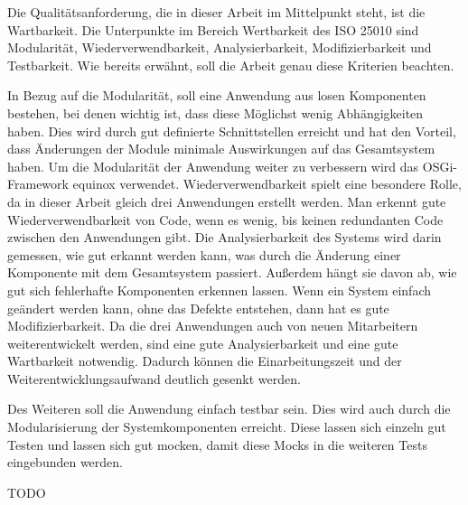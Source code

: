Die Qualitätsanforderung, die in dieser Arbeit im Mittelpunkt steht, ist die Wartbarkeit. Die Unterpunkte im Bereich Wertbarkeit des ISO 25010 sind Modularität, Wiederverwendbarkeit, Analysierbarkeit, Modifizierbarkeit und Testbarkeit. Wie bereits erwähnt, soll die Arbeit genau diese Kriterien beachten. 

In Bezug auf die Modularität, soll eine Anwendung aus losen Komponenten bestehen, bei denen wichtig ist, dass diese Möglichst wenig Abhängigkeiten haben. Dies wird durch gut definierte Schnittstellen erreicht und hat den Vorteil, dass Änderungen der Module minimale Auswirkungen auf das Gesamtsystem haben. Um die Modularität der Anwendung weiter zu verbessern wird das OSGi-Framework \Gls{equinox} verwendet.
Wiederverwendbarkeit spielt eine besondere Rolle, da in dieser Arbeit gleich drei Anwendungen erstellt werden. Man erkennt gute Wiederverwendbarkeit von Code, wenn es wenig, bis keinen redundanten Code zwischen den Anwendungen gibt. Die Analysierbarkeit des Systems wird darin gemessen, wie gut erkannt werden kann, was durch die Änderung einer Komponente mit dem Gesamtsystem passiert. Außerdem hängt sie davon ab, wie gut sich fehlerhafte Komponenten erkennen lassen. Wenn ein System einfach geändert werden kann, ohne das Defekte entstehen, dann hat es gute Modifizierbarkeit. Da die drei Anwendungen auch von neuen Mitarbeitern weiterentwickelt werden, sind eine gute Analysierbarkeit und eine gute Wartbarkeit notwendig.  Dadurch können die Einarbeitungszeit und der Weiterentwicklungsaufwand deutlich gesenkt werden.

Des Weiteren soll die Anwendung einfach testbar sein. Dies wird auch durch die Modularisierung der Systemkomponenten erreicht. Diese lassen sich einzeln gut Testen und lassen sich gut mocken, damit diese Mocks in die weiteren Tests eingebunden werden.

TODO
